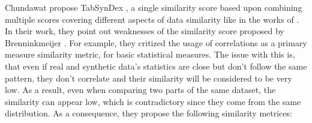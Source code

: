 Chundawat \etal propose TabSynDex \cite{chundawat2022UniversalMetricRobust}, a single similarity score based upon combining multiple scores covering different aspects of data similarity like in the works of \cite{brenninkmeijer2019GenerationEvaluationTabular}.
In their work, they point out weaknesses of the similarity score proposed by Brenninkmeijer \etal \cite{brenninkmeijer2019GenerationEvaluationTabular}.
For example, they critized the usage of correlations as a primary measure similarity metric, for basic statistical measures.
The issue with this is, that even if real and synthetic data's statistics are close but don't follow the same pattern, they don't correlate and their similarity will be considered to be very low.
As a result, even when comparing two parts of the same dataset, the similarity can appear low, which is contradictory since they come from the same distribution.
As a consequence, they propose the following similarity metrices:

